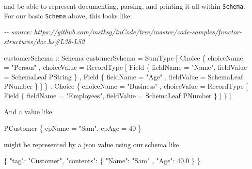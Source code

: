 \documentclass[]{article}
\newenvironment{Shaded}{}{}
\newcommand{\CommentTok}[1]{\textcolor[rgb]{0.38,0.63,0.69}{\textit{#1}}}
\newcommand{\DataTypeTok}[1]{\textcolor[rgb]{0.56,0.13,0.00}{#1}}
\newcommand{\DecValTok}[1]{\textcolor[rgb]{0.25,0.63,0.44}{#1}}
\newcommand{\FloatTok}[1]{\textcolor[rgb]{0.25,0.63,0.44}{#1}}
\newcommand{\FunctionTok}[1]{\textcolor[rgb]{0.02,0.16,0.49}{#1}}
\newcommand{\NormalTok}[1]{#1}
\newcommand{\OtherTok}[1]{\textcolor[rgb]{0.00,0.44,0.13}{#1}}
\newcommand{\StringTok}[1]{\textcolor[rgb]{0.25,0.44,0.63}{#1}}
\begin{document}
and be able to represent documenting, parsing, and printing it all within
\texttt{Schema}. For our basic \texttt{Schema} above, this looks like:

\begin{Shaded}
\begin{Highlighting}[]
\CommentTok{{-}{-} source: https://github.com/mstksg/inCode/tree/master/code{-}samples/functor{-}structures/doc.hs\#L38{-}L52}

\OtherTok{customerSchema ::} \DataTypeTok{Schema}
\NormalTok{customerSchema }\OtherTok{=} \DataTypeTok{SumType}
\NormalTok{    [ }\DataTypeTok{Choice}
\NormalTok{        \{ choiceName  }\OtherTok{=} \StringTok{"Person"}
\NormalTok{        , choiceValue }\OtherTok{=} \DataTypeTok{RecordType}
\NormalTok{            [ }\DataTypeTok{Field}\NormalTok{ \{ fieldName }\OtherTok{=} \StringTok{"Name"}\NormalTok{, fieldValue }\OtherTok{=} \DataTypeTok{SchemaLeaf} \DataTypeTok{PString}\NormalTok{ \}}
\NormalTok{            , }\DataTypeTok{Field}\NormalTok{ \{ fieldName }\OtherTok{=} \StringTok{"Age"}\NormalTok{ , fieldValue }\OtherTok{=} \DataTypeTok{SchemaLeaf} \DataTypeTok{PNumber}\NormalTok{ \}}
\NormalTok{            ]}
\NormalTok{        \}}
\NormalTok{    , }\DataTypeTok{Choice}
\NormalTok{        \{ choiceName  }\OtherTok{=} \StringTok{"Business"}
\NormalTok{        , choiceValue }\OtherTok{=} \DataTypeTok{RecordType}
\NormalTok{            [ }\DataTypeTok{Field}\NormalTok{ \{ fieldName }\OtherTok{=} \StringTok{"Employees"}\NormalTok{, fieldValue }\OtherTok{=} \DataTypeTok{SchemaLeaf} \DataTypeTok{PNumber}\NormalTok{ \} ]}
\NormalTok{        \}}
\NormalTok{    ]}
\end{Highlighting}
\end{Shaded}

And a value like

\begin{Shaded}
\begin{Highlighting}[]
\DataTypeTok{PCustomer}\NormalTok{ \{ cpName }\OtherTok{=} \StringTok{"Sam"}\NormalTok{, cpAge }\OtherTok{=} \DecValTok{40}\NormalTok{ \}}
\end{Highlighting}
\end{Shaded}

might be represented by a json value using our schema like

\begin{Shaded}
\begin{Highlighting}[]
\FunctionTok{\{} \DataTypeTok{"tag"}\FunctionTok{:} \StringTok{"Customer"}\FunctionTok{,}
  \DataTypeTok{"contents"}\FunctionTok{:}
    \FunctionTok{\{} \DataTypeTok{"Name"}\FunctionTok{:} \StringTok{"Sam"}
    \FunctionTok{,} \DataTypeTok{"Age"}\FunctionTok{:} \FloatTok{40.0}
    \FunctionTok{\}}
\FunctionTok{\}}
\end{Highlighting}
\end{Shaded}
\end{document}
